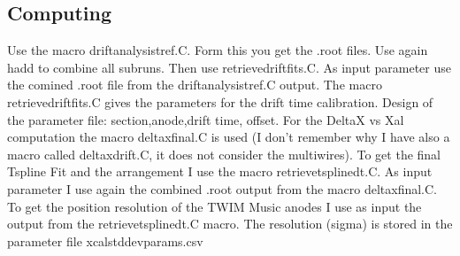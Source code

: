 \documentclass{report}
\begin{document}
\subsection{Computing}
Use the macro \dq drift\textunderscore analysis\textunderscore tref.C\dq{}. Form this you get the .root files. Use again \dq hadd\dq{} to combine all subruns. Then use retrieve\textunderscore drift\textunderscore fits.C. As input parameter use the comined .root file from the drift\textunderscore analysis\textunderscore tref.C output. The macro retrieve\textunderscore drift\textunderscore fits.C gives the parameters for the drift time calibration. \newline
Design of the parameter file: section,anode,drift time, offset.\newline
For the DeltaX vs Xal computation the macro \dq delta\textunderscore x\textunderscore final.C\dq{} is used (I don't remember why I have also a macro called \dq delta\textunderscore x\textunderscore drift.C\dq{}, it does not consider the multiwires).\newline
To get the final Tspline Fit and the arrangement I use the macro \dq retrieve\textunderscore tspline\textunderscore dt.C\dq{}. As input parameter I use again the combined .root output from the macro \dq delta\textunderscore x\textunderscore final.C\dq{}.\newline
To get the position resolution of the TWIM Music anodes I use as input the output from the \dq retrieve\textunderscore tspline\textunderscore dt.C\dq{} macro. The resolution (sigma) is stored in the parameter file \dq xcal\textunderscore std\textunderscore dev\textunderscore params.csv\dq{}
\end{document}
